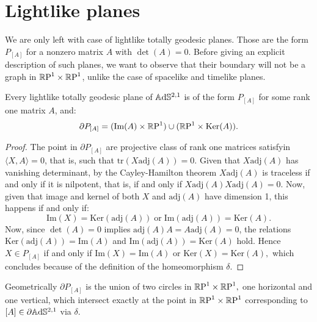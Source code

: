 \section{Lightlike planes}
We are only left with case of lightlike totally geodesic planes. Those are the form $P_{[A]}$ for a nonzero matrix $A$ with $\det(A)=0$. Before giving an explicit description of such planes, we want to observe that their boundary will not be a graph in $\T$, unlike the case of spacelike and timelike planes. 

\begin{lemma}
    Every lightlike totally geodesic plane of $\A^{2,1}$ is of the form $P_{[A]}$ for some rank one matrix $A$, and: 
    \[
        \partial P_{[A]}=(\text{Im}(A)\times\S)\cup(\S\times\text{Ker}(A)).
    \]
\end{lemma}
\begin{proof}
    The point in $\partial P_{[A]}$ are projective class of rank one matrices satisfyin $\langle X,A\rangle=0$, that is, such that $\text{tr}(X\text{adj}(A))=0.$ Given that $X\text{adj}(A)$ has vanishing determinant, by the Cayley-Hamilton theorem $X\text{adj}(A)$ is traceless if and only if it is nilpotent, that is, if and only if $X\text{adj}(A)X\text{adj}(A)=0.$ Now, given that image and kernel of both $X$ and $\text{adj}(A)$ have dimension 1, this happens if and only if: 
    \begin{equation}
        \text{Im}(X)=\text{Ker}(\text{adj}(A))\;\text{or}\;\text{Im}(\text{adj}(A))=\text{Ker}(A).
    \end{equation}
    Now, since $\det(A)=0$ implies $\text{adj}(A)A=A\text{adj}(A)=0$, the relations $\text{Ker}(\text{adj}(A))=\text{Im}(A)$ and $\text{Im}(\text{adj}(A))=\text{Ker}(A)$ hold. Hence $X\in P_{[A]}$ if and only if $\text{Im}(X)=\text{Im}(A)$ or $\text{Ker}(X)=\text{Ker}(A),$ which concludes because of the definition of the homeomorphism $\delta$.  
\end{proof}

Geometrically $\partial P_{[A]}$ is the union of two circles in $\T,$ one horizontal and one vertical, which intersect exactly at the point in $\T$ corresponding to $[A]\in \partial\A^{2,1}$ via $\delta$.\\

